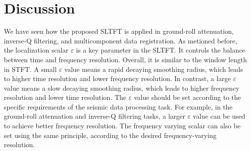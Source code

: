 
\begin{table*}
	\centering
	\caption{Comparison of Time Consumptions.$^1$}
	\label{tb:comparison1}
\end{table*}


\section{Discussion}
We have seen how the proposed SLTFT is applied in ground-roll
attenuation, inverse-Q filtering, and multicomponent data
registration. As metioned before, the localization scalar
$\varepsilon$ is a key parameter in the SLTFT. It controls the balance
between time and frequency resolution. Overall, it is similar to the
window length in STFT. A small $\varepsilon$ value means a rapid
decaying smoothing radius, which leads to higher time resolution and
lower frequency resolution. In contrast, a large $\varepsilon$ value
means a slow decaying smoothing radius, which leads to higher
frequency resolution and lower time resolution. The $\varepsilon$
value should be set according to the specific requirements of the
seismic data processing task. For example, in the ground-roll
attenuation and inverse-Q filtering tasks, a larger $\varepsilon$
value can be used to achieve better frequency resolution. The
frequency varying scalar can also be set using the same principle,
according to the desired frequency-varying resolution.


